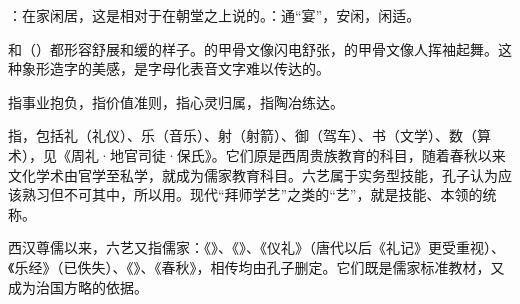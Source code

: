 {
\item {}：在家闲居，这是相对于在朝堂之上说的。：通“宴”，安闲，闲适。 %
\item {}和（）都形容舒展和缓的样子。的甲骨文像闪电舒张，的甲骨文像人挥袖起舞。这种象形造字的美感，是字母化表音文字难以传达的。%
}
{}


{
}
{} %


{
\item {}指事业抱负，指价值准则，指心灵归属，指陶冶练达。

\item {}指，包括礼（礼仪）、乐（音乐）、射（射箭）、御（驾车）、书（文学）、数（算术），见《周礼·地官司徒·保氏》。它们原是西周贵族教育的科目，随着春秋以来文化学术由官学至私学，就成为儒家教育科目。六艺属于实务型技能，孔子认为应该熟习但不可其中，所以用。现代“拜师学艺”之类的“艺”，就是技能、本领的统称。

西汉尊儒以来，六艺又指儒家：《》、《》、《仪礼》（唐代以后《礼记》更受重视）、《乐经》（已佚失）、《》、《春秋》，相传均由孔子删定。它们既是儒家标准教材，又成为治国方略的依据。
}
{}


